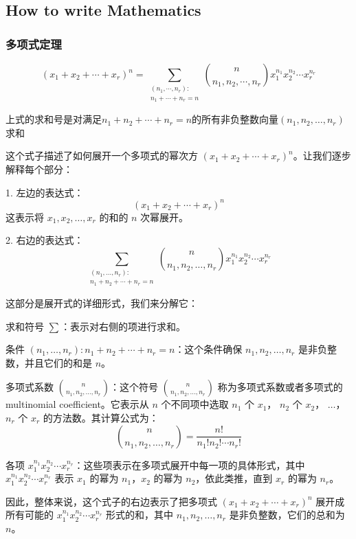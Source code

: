 \documentclass{article}
\begin{document}
\subsection{How to write Mathematics}

\subsubsection{多项式定理}

$$(x_1+x_2+\cdots+x_{r})^{n}=\sum_{\begin{array}{c}(n_1,\cdots,n_{r}):\\ n_1+\cdots+n_{r}=n\end{array}}\binom{n}{n_{1},n_{2},\cdots,n_{r}}x_1^{n_1}x_2^{n_2}\cdots x_{r}^{n_{r}}$$

上式的求和号是对满足$n_1+n_2+\cdots+n_r=n$的所有非负整数向量$(n_1,n_2,\dots,n_r)$求和


这个式子描述了如何展开一个多项式的幂次方 \((x_1 + x_2 + \cdots + x_r)^n\)。让我们逐步解释每个部分：

1. 左边的表达式：
   \[(x_1 + x_2 + \cdots + x_r)^n\]
   这表示将 \(x_1, x_2, \ldots, x_r\) 的和的 \(n\) 次幂展开。

2. 右边的表达式：
   \[\sum_{\substack{(n_1, \ldots, n_r): \\ n_1 + n_2 + \cdots + n_r = n}} \binom{n}{n_1, n_2, \ldots, n_r} x_1^{n_1} x_2^{n_2} \cdots x_r^{n_r}\]

   这部分是展开式的详细形式，我们来分解它：

   求和符号 \(\sum\)：表示对右侧的项进行求和。
   
   条件 \((n_1, \ldots, n_r): n_1 + n_2 + \cdots + n_r = n\)：这个条件确保 \(n_1, n_2, \ldots, n_r\) 是非负整数，并且它们的和是 \(n\)。

   多项式系数 \(\binom{n}{n_1, n_2, \ldots, n_r}\)：这个符号 \(\binom{n}{n_1, n_2, \ldots, n_r}\) 称为多项式系数或者多项式的 multinomial coefficient。它表示从 \(n\) 个不同项中选取 \(n_1\) 个 \(x_1\)， \(n_2\) 个 \(x_2\)， \(\ldots\)， \(n_r\) 个 \(x_r\) 的方法数。其计算公式为：
   \[\binom{n}{n_1, n_2, \ldots, n_r} = \frac{n!}{n_1! n_2! \cdots n_r!}\]

   各项 \(x_1^{n_1} x_2^{n_2} \cdots x_r^{n_r}\)：这些项表示在多项式展开中每一项的具体形式，其中 \(x_1^{n_1} x_2^{n_2} \cdots x_r^{n_r}\) 表示 \(x_1\) 的幂为 \(n_1\)，\(x_2\) 的幂为 \(n_2\)，依此类推，直到 \(x_r\) 的幂为 \(n_r\)。

因此，整体来说，这个式子的右边表示了把多项式 \((x_1 + x_2 + \cdots + x_r)^n\) 展开成所有可能的 \(x_1^{n_1} x_2^{n_2} \cdots x_r^{n_r}\) 形式的和，其中 \(n_1, n_2, \ldots, n_r\) 是非负整数，它们的总和为 \(n\)。
\end{document}
